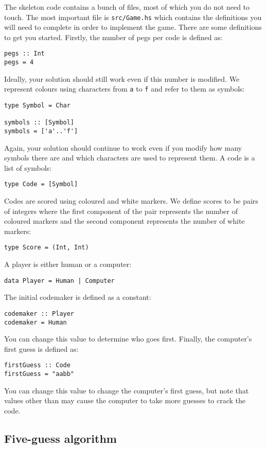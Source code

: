 The skeleton code contains a bunch of files, most of which you do not need to touch. The most important file is \texttt{\small src/Game.hs} which contains the definitions you will need to complete in order to implement the game. There are some definitions to get you started. Firstly, the number of pegs per code is defined as:
\begin{verbatim}
pegs :: Int 
pegs = 4
\end{verbatim}
Ideally, your solution should still work even if this number is modified. We represent colours using characters from \texttt{a} to \texttt{f} and refer to them as symbols:
\begin{verbatim}
type Symbol = Char 

symbols :: [Symbol]
symbols = ['a'..'f']
\end{verbatim}
Again, your solution should continue to work even if you modify how many symbols there are and which characters are used to represent them. A code is a list of symbols:
\begin{verbatim}
type Code = [Symbol]
\end{verbatim}
Codes are scored using coloured and white markers. We define scores to be pairs of integers where the first component of the pair represents the number of coloured markers and the second component represents the number of white markers:
\begin{verbatim}
type Score = (Int, Int)
\end{verbatim}
A player is either human or a computer:
\begin{verbatim}
data Player = Human | Computer
\end{verbatim}
The initial codemaker is defined as a constant:
\begin{verbatim}
codemaker :: Player
codemaker = Human
\end{verbatim}
You can change this value to determine who goes first. Finally, the computer's first guess is defined as:
\begin{verbatim}
firstGuess :: Code 
firstGuess = "aabb"
\end{verbatim}
You can change this value to change the computer's first guess, but note that values other than  may cause the computer to take more guesses to crack the code.


\subsection{Five-guess algorithm}

